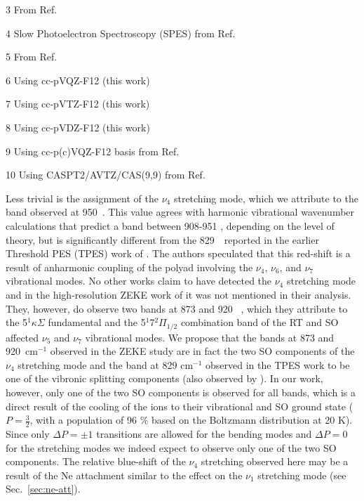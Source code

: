 \begin{landscape}
\begin{table}
\begin{threeparttable}
\begin{tablenotes}
        \item[3] From Ref.\ \cite{Smith-Gicklhorn2001VibrationalCations}
        \item[4] Slow Photoelectron Spectroscopy (SPES) from Ref.\ \cite{Leach2014IonizationCyanoacetylene} 
        \item[5] From Ref.\ \cite{Dai2015TheCalculations}
        \item[6] Using cc-pVQZ-F12 (this work)
        \item[7] Using cc-pVTZ-F12 (this work)
        \item[8] Using cc-pVDZ-F12 (this work)
        \item[9] Using cc-p(c)VQZ-F12 basis from Ref.\ \cite{Dai2015TheCalculations}
        \item[10] Using CASPT2/AVTZ/CAS(9,9) from Ref.\ \cite{Desrier2016ExperimentalSpectroscopy}
    \end{tablenotes}
\end{threeparttable}
\end{table}
\end{landscape}
\clearpage

Less trivial is the assignment of the $\nu_4$  stretching mode, which we attribute to the band observed at 950~\wn. 
This value agrees with harmonic vibrational wavenumber calculations that predict a band between 908-951 \wn, depending on the level of theory, but is significantly different from the 829~\wn\ reported in the earlier Threshold PES (TPES) work of \citet{Desrier2016ExperimentalSpectroscopy}. 
The authors speculated that this red-shift is a result of anharmonic coupling of the polyad involving the $\nu_4$, $\nu_6$, and $\nu_7$ vibrational modes. 
No other works claim to have detected the $\nu_4$ stretching mode and in the high-resolution ZEKE work of \citet{Dai2015TheCalculations} it was not mentioned in their analysis. 
They, however, do observe two bands at 873 and 920~ \wn, which they attribute to the 5$^1\kappa\Sigma$ fundamental and the 5$^1$7$^2\Pi_{1/2}$ combination band of the RT and SO affected $\nu_5$ and $\nu_7$ vibrational modes. 
We propose that the bands at 873 and 920~cm$^{-1}$ observed in the ZEKE study are in fact the two SO components of the $\nu_4$ stretching mode and the band at 829 cm$^{-1}$ observed in the TPES work to be one of the vibronic splitting components (also observed by \citet{Dai2015TheCalculations}). In our work, however, only one of the two SO components is observed for all bands, which is a direct result of the cooling of the ions to their vibrational and SO ground state ($P = \frac{3}{2}$, with a population of 96 \% based on the Boltzmann distribution at 20 K). Since only $\Delta P = \pm 1 $ transitions are allowed for the bending modes and $\Delta P = 0 $ for the stretching modes we indeed expect to observe only one of the two SO components. 
The relative blue-shift of the $\nu_4$ stretching observed here may be a result of the Ne attachment similar to the effect on the $\nu_1$  stretching mode (see Sec.~\ref{sec:ne-att}).  


